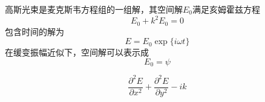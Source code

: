 

高斯光束是麦克斯韦方程组的一组解，其空间解$E_0$满足亥姆霍兹方程
\begin{equation}
E_0 + k^2E_0=0
\end{equation}
包含时间的解为
\begin{equation}
E=E_0\exp\{i\omega t\}
\end{equation}
在缓变振幅近似下，空间解可以表示成
\begin{equation}
E_0=\psi
\end{equation}


\begin{equation}
\frac{\partial^2 E}{\partial x^2} +\frac{\partial^2 E}{\partial y^2} -ik 
\end{equation}
